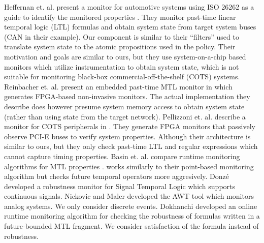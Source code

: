 Heffernan et. al. present a monitor for automotive systems using ISO 26262 as a guide
to identify the monitored properties  \cite{Heffernan2014}.
They monitor past-time linear temporal logic (LTL) formulas and obtain system state from target system buses (CAN in their example).
Our \sfmap component is similar to their ``filters'' used to translate system state to the atomic propositions used in the policy.
Their motivation and goals are similar to ours, but they use system-on-a-chip based
monitors which utilize instrumentation to obtain system state, which is not suitable for monitoring black-box commercial-off-the-shelf (COTS)
systems. Reinbacher et. al. present an embedded past-time MTL monitor in \cite{Reinbacher2013} which generates FPGA-based non-invasive monitors.
The actual implementation they describe does however presume system memory access to obtain system state (rather than using state from the target network).
Pellizzoni et. al. describe a monitor for COTS peripherals in \cite{Pellizzoni2008}.
They generate FPGA monitors that passively observe PCI-E buses to verify system properties.
Although their architecture is similar to ours, but they only check past-time LTL and
regular expressions which cannot capture timing properties.
Basin et. al. compare runtime monitoring algorithms for MTL properties \cite{Basin2012}.
\monitor works similarly to their point-based monitoring algorithm but \monitor checks
future temporal operators more aggresively.
Donz\'e \etal \cite{DFM13} developed a robustness monitor for Signal Temporal Logic  which
supports continuous signals.
Nickovic and Maler \cite{NM07} developed the  AWT tool which monitors analog systems.
We only consider discrete events. Dokhanchi \etal \cite{DHF14}
developed an online runtime monitoring algorithm for checking the robustness of formulas written in a
future-bounded MTL fragment. We consider satisfaction of the formula
instead of robustness.

